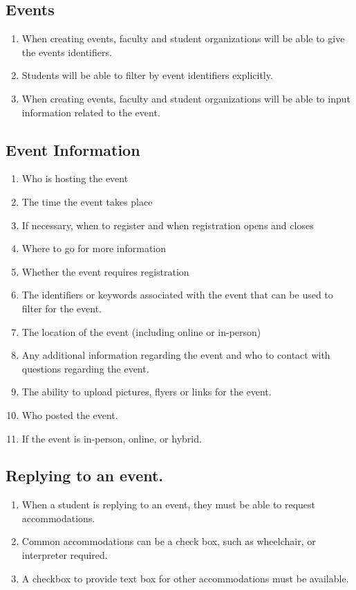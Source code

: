 \subsection{Events}
	\begin{enumerate}[leftmargin=3\parindent]
		\item When creating events, faculty and student organizations will be able to give the events identifiers.
		\item Students will be able to filter by event identifiers explicitly.
		\item When creating events, faculty and student organizations will be able to input information related to the event.
	\end{enumerate}
	\subsection{Event Information}
		\begin{enumerate}[leftmargin=3\parindent]
			\item Who is hosting the event
			\item The time the event takes place
			\item If necessary, when to register and when registration opens and closes
			\item Where to go for more information
			\item Whether the event requires registration
			\item The identifiers or keywords associated with the event that can be used to filter for the event.
			\item The location of the event (including online or in-person)
			\item Any additional information regarding the event and who to contact with questions regarding the event.
			\item The ability to upload pictures, flyers or links for the event.
			\item Who posted the event.
			\item If the event is in-person, online, or hybrid.
		\end{enumerate}
	\subsection{Replying to an event.}
		\begin{enumerate}[leftmargin=3\parindent]
			\item When a student is replying to an event, they must be able to request accommodations.
			\item Common accommodations can be a check box, such as wheelchair, or interpreter required.
			\item A checkbox to provide text box for other accommodations must be available.
		\end{enumerate}
\newpage %
